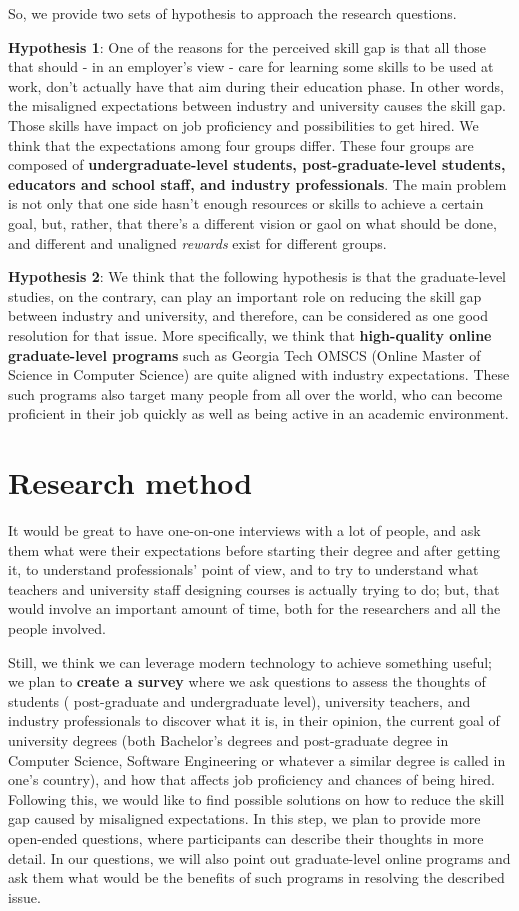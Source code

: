 \documentclass{sigchi}
\begin{document}
So, we provide two sets of hypothesis to approach the research questions.

\textbf{Hypothesis 1}: One of the reasons for the perceived skill gap is that all those that should - in an employer's view - care for learning some skills to be used at work, don't actually have that aim during their education phase. In other words, the misaligned expectations between industry and university causes the skill gap. Those skills have impact on job proficiency and possibilities to get hired. We think that the expectations among four groups differ. These four groups are composed of \textbf{undergraduate-level students, post-graduate-level students, educators and school staff, and industry professionals}. The main problem is not only that one side hasn’t enough resources or skills to achieve a certain goal, but, rather, that there’s a different vision or gaol on what should be done, and different and unaligned \textit{rewards} exist for different groups.  

\textbf{Hypothesis 2}:  We think that the following hypothesis is that the graduate-level studies, on the contrary, can play an important role on reducing the skill gap between industry and university, and therefore, can be considered as one good resolution for that issue. More specifically, we think that \textbf{high-quality online graduate-level programs} such as Georgia Tech OMSCS (Online Master of Science in Computer Science) are quite aligned with industry expectations. These such programs also target many people from all over the world, who can become proficient in their job quickly as well as being active in an academic environment.

\section{Research method}
It would be great to have one-on-one interviews with a lot of people, and ask them what were their expectations before starting their degree and after getting it, to understand professionals' point of view, and to try to understand what teachers and university staff designing courses is actually trying to do; but, that would involve an important amount of time, both for the researchers and all the people involved.

Still, we think we can leverage modern technology to achieve something useful; we plan to \textbf{create a survey} where we ask questions to assess the thoughts of students ( post-graduate and undergraduate level), university teachers, and industry professionals to discover what it is, in their opinion, the current goal of university degrees (both Bachelor's degrees and post-graduate degree in Computer Science, Software Engineering or whatever a similar degree is called in one's country), and how that affects job proficiency and chances of being hired. Following this, we would like to find possible solutions on how to reduce the skill gap caused by misaligned expectations. In this step, we plan to provide more open-ended questions, where participants can describe their thoughts in more detail. In our questions, we will also point out graduate-level online programs and ask them what would be the benefits of such programs in resolving the described issue.
\end{document}
